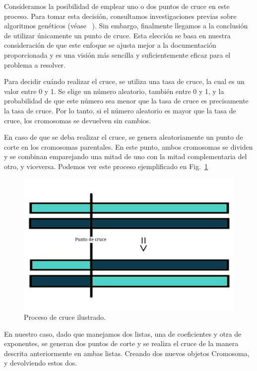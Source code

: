 \documentclass[conference,a4paper]{IEEEtran}
\def\figurename{Fig.}
\begin{document}
Consideramos la posibilidad de emplear uno o dos puntos de cruce en este proceso. Para tomar esta decisión, consultamos investigaciones previas sobre algoritmos genéticos (véase ~\cite{b1}). Sin embargo, finalmente llegamos a la conclusión de utilizar únicamente un punto de cruce. Esta elección se basa en nuestra consideración de que este enfoque se ajusta mejor a la documentación proporcionada y es una visión más sencilla y suficientemente eficaz para el problema a resolver.

Para decidir cuándo realizar el cruce, se utiliza una tasa de cruce, la cual es un valor entre 0 y 1. Se elige un número aleatorio, también entre 0 y 1, y la probabilidad de que este número sea menor que la tasa de cruce es precisamente la tasa de cruce. Por lo tanto, si el número aleatorio es mayor que la tasa de cruce, los cromosomas se devuelven sin cambios. 

En caso de que se deba realizar el cruce, se genera aleatoriamente un punto de corte en los cromosomas parentales. En este punto, ambos cromosomas se dividen y se combinan emparejando una mitad de uno con la mitad complementaria del otro, y viceversa. Podemos ver este proceso ejemplificado en \figurename~\ref{fig:chromosome-crossover}


\begin{figure}[h]
    \centering
    \includegraphics[width=\columnwidth]{image-chromosome-crossover.jpg}
    \caption{Proceso de cruce ilustrado.}
    \label{fig:chromosome-crossover}
\end{figure}


En nuestro caso, dado que manejamos dos listas, una de coeficientes y otra de exponentes, se generan dos puntos de corte y se realiza el cruce de la manera descrita anteriormente en ambas listas. Creando dos nuevos objetos Cromosoma, y devolviendo estos dos.
\end{document}
